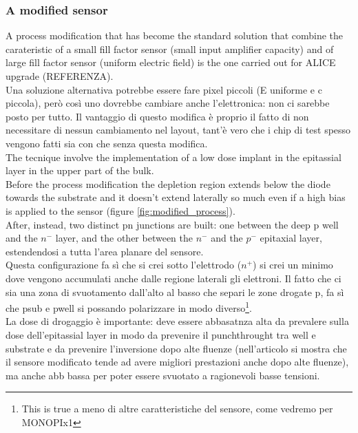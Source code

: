 \begin{titlepage}
\subsubsection{A modified sensor}
A process modification that has become the standard solution that combine the carateristic
of a small fill factor sensor (small input amplifier capacity) and of large fill factor sensor
(uniform electric field) is the one carried out for ALICE upgrade (REFERENZA).\\
Una soluzione alternativa potrebbe essere fare pixel piccoli (E uniforme e c piccola), però 
così uno dovrebbe cambiare anche l'elettronica: non ci sarebbe posto per tutto. Il vantaggio
di questo modifica è proprio il fatto di non necessitare di nessun cambiamento nel layout,
tant'è vero che i chip di test spesso vengono fatti sia con che senza questa modifica.\\
The tecnique involve the implementation of a low dose implant in the epitassial layer in the 
upper part of the bulk.\\
Before the process modification the depletion region extends below the diode towards the 
substrate and it doesn't extend laterally so much even if a high bias is applied to 
the sensor (figure \ref{fig:modified_process}). \\
After, instead, two distinct pn junctions are built: one between the deep p well and the 
$n^-$ layer, and the other between the $n^-$ and the $p^-$ epitaxial layer, estendendosi a tutta l'area
planare del sensore.\\
Questa configurazione fa sì che si crei sotto l'elettrodo ($n^+$) si crei un minimo dove vengono 
accumulati anche dalle regione laterali gli elettroni. 
Il fatto che ci sia una zona di svuotamento dall'alto al basso che separi le zone drogate p, fa sì
che psub e pwell si possando polarizzare in modo diverso\footnote{This is true a meno di altre 
caratteristiche del sensore, come vedremo per MONOPIx1}.\\
La dose di drogaggio è importante: deve essere abbasatnza alta da prevalere sulla dose
dell'epitassial layer in modo da prevenire il punchthrought tra well e substrate e da 
prevenire l'inversione dopo alte fluenze (nell'articolo si mostra che il sensore modificato
tende ad avere migliori prestazioni anche dopo alte fluenze), ma anche abb bassa per poter essere svuotato 
a ragionevoli basse tensioni.\\
\begin{figure}
   \centering

\end{figure}
\end{titlepage}
